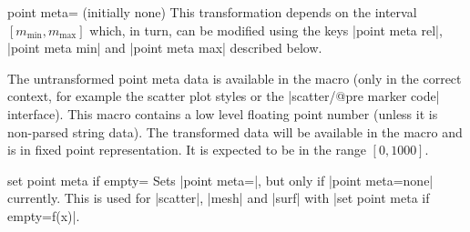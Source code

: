 \begin{pgfplotskey}{point meta= (initially none)}
	This transformation depends on the interval $[m_{\text{min}},m_{\text{max}}]$ which, in turn, can be modified using the keys |point meta rel|, |point meta min| and |point meta max| described below.

	The untransformed point meta data is available in the macro \declareandlabel{\pgfplotspointmeta} (only in the correct context, for example the scatter plot styles or the |scatter/@pre marker code| interface). This macro contains a low level floating point number (unless it is non-parsed string data). The transformed data will be available in the macro \declareandlabel{\pgfplotspointmetatransformed} and is in fixed point representation. It is expected to be in the range $[0,1000]$.

\end{pgfplotskey}

\begin{pgfplotskey}{set point meta if empty=}
	Sets |point meta=|, but only if |point meta=none| currently. This is used for |scatter|, |mesh| and |surf| with |set point meta if empty=f(x)|.
\end{pgfplotskey}


